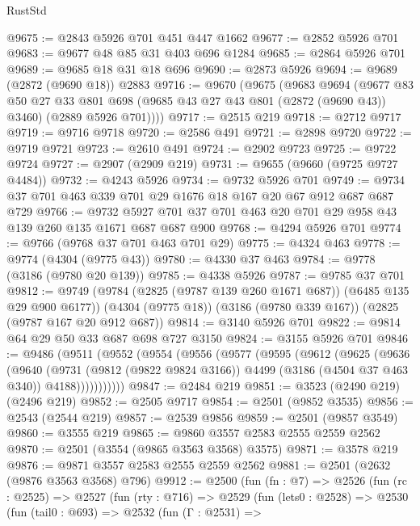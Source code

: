\begin{lexlean}{RustStd}
\begin{coremodule}
@9675 := @2843 @5926 @701 @451 @447 @1662
@9677 := @2852 @5926 @701
@9683 := @9677 @48 @85 @31 @403 @696 @1284
@9685 := @2864 @5926 @701
@9689 := @9685 @18 @31 @18 @696
@9690 := @2873 @5926
@9694 := @9689 (@2872 (@9690 @18)) @2883
@9716 := @9670
    (@9675
      (@9683
        @9694
        (@9677
          @83
          @50
          @27
          @33
          @801
          @698
          (@9685 @43 @27 @43 @801 (@2872 (@9690 @43)) @3460)
          (@2889 @5926 @701))))
@9717 := @2515 @219
@9718 := @2712 @9717
@9719 := @9716 @9718
@9720 := @2586 @491
@9721 := @2898 @9720
@9722 := @9719 @9721
@9723 := @2610 @491
@9724 := @2902 @9723
@9725 := @9722 @9724
@9727 := @2907 (@2909 @219)
@9731 := @9655 (@9660 (@9725 @9727 @4484))
@9732 := @4243 @5926
@9734 := @9732 @5926 @701
@9749 := @9734 @37 @701 @463 @339 @701 @29 @1676 @18 @167 @20 @67 @912 @687 @687 @729
@9766 := @9732 @5927 @701 @37 @701 @463 @20 @701 @29 @958 @43 @139 @260 @135 @1671 @687 @687 @900
@9768 := @4294 @5926 @701
@9774 := @9766 (@9768 @37 @701 @463 @701 @29)
@9775 := @4324 @463
@9778 := @9774 (@4304 (@9775 @43))
@9780 := @4330 @37 @463
@9784 := @9778 (@3186 (@9780 @20 @139))
@9785 := @4338 @5926
@9787 := @9785 @37 @701
@9812 := @9749
    (@9784 (@2825 (@9787 @139 @260 @1671 @687)) (@6485 @135 @29 @900 @6177))
    (@4304 (@9775 @18))
    (@3186 (@9780 @339 @167))
    (@2825 (@9787 @167 @20 @912 @687))
@9814 := @3140 @5926 @701
@9822 := @9814 @64 @29 @50 @33 @687 @698 @727 @3150
@9824 := @3155 @5926 @701
@9846 := @9486
    (@9511
      (@9552
        (@9554
          (@9556
            (@9577
              (@9595
                (@9612
                  (@9625
                    (@9636
                      (@9640
                        (@9731
                          (@9812 (@9822 @9824 @3166))
                          @4499
                          (@3186 (@4504 @37 @463 @340))
                          @4188)))))))))))
@9847 := @2484 @219
@9851 := @3523 (@2490 @219) (@2496 @219)
@9852 := @2505 @9717
@9854 := @2501 (@9852 @3535)
@9856 := @2543 (@2544 @219)
@9857 := @2539 @9856
@9859 := @2501 (@9857 @3549)
@9860 := @3555 @219
@9865 := @9860 @3557 @2583 @2555 @2559 @2562
@9870 := @2501 (@3554 (@9865 @3563 @3568) @3575)
@9871 := @3578 @219
@9876 := @9871 @3557 @2583 @2555 @2559 @2562
@9881 := @2501 (@2632 (@9876 @3563 @3568) @796)
@9912 := @2500
    (fun (fn : @7) =>
    @2526
      (fun (rc : @2525) =>
      @2527
        (fun (rty : @716) =>
        @2529
          (fun (lets0 : @2528) =>
          @2530
            (fun (tail0 : @693) =>
            @2532
              (fun (Γ : @2531) =>

\end{coremodule}
\end{lexlean}
